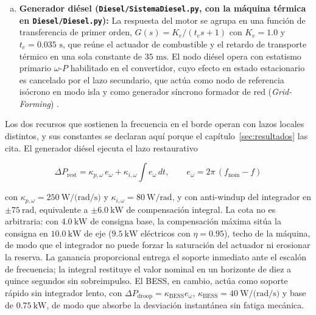 \begin{enumerate}[a)]
    \item \textbf{Generador diésel (\texttt{Diesel/SistemaDiesel.py}, con la máquina térmica en \texttt{Diesel/Diesel.py}):} La respuesta del motor se agrupa en una función de transferencia de primer orden, $G(s) = K_e/(t_e s + 1)$ con $K_e = 1.0$ y $t_e = 0.035\text{ s}$, que reúne el actuador de combustible y el retardo de transporte térmico en una sola constante de $35\text{ ms}$. El nodo diésel opera con estatismo primario $\omega$-$P$ habilitado en el convertidor, cuyo efecto en estado estacionario es cancelado por el lazo secundario, que actúa como nodo de referencia isócrono en modo isla y como generador síncrono formador de red (\textit{Grid-Forming}) \citep{Saadat2010}.
\end{enumerate}

Los dos recursos que sostienen la frecuencia en el borde operan con lazos locales distintos, y sus constantes se declaran aquí porque el capítulo~\ref{sec:resultados} las cita. El generador diésel ejecuta el lazo restaurativo

\begin{equation}\label{eq:rest_local}
\Delta P_{\text{rest}} = \kappa_{p,\omega}\, e_\omega + \kappa_{i,\omega} \int e_\omega\, dt, \qquad e_\omega = 2\pi\,(f_{\text{nom}} - f)
\end{equation}

con $\kappa_{p,\omega} = 250\ \text{W/(rad/s)}$ y $\kappa_{i,\omega} = 80\ \text{W/rad}$, y con anti-windup del integrador en $\pm 75\ \text{rad}$, equivalente a $\pm 6.0\ \text{kW}$ de compensación integral. La cota no es arbitraria: con $4.0\ \text{kW}$ de consigna base, la compensación máxima sitúa la consigna en $10.0\ \text{kW}$ de eje ($9.5\ \text{kW}$ eléctricos con $\eta = 0.95$), techo de la máquina, de modo que el integrador no puede forzar la saturación del actuador ni erosionar la reserva. La ganancia proporcional entrega el soporte inmediato ante el escalón de frecuencia; la integral restituye el valor nominal en un horizonte de diez a quince segundos sin sobreimpulso. El BESS, en cambio, actúa como soporte rápido sin integrador lento, con $\Delta P_{\text{droop}} = \kappa_{\text{BESS}} e_\omega$, $\kappa_{\text{BESS}} = 40\ \text{W/(rad/s)}$ y base de $0.75\ \text{kW}$, de modo que absorbe la desviación instantánea sin fatiga mecánica.

